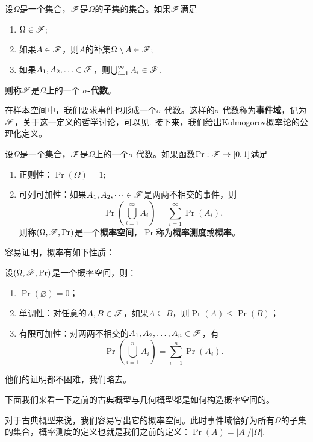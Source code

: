 \begin{definition}[$\sigma$-代数]
设$\Omega$是一个集合，$\mathscr{F}$是$\Omega$的子集的集合。如果$\mathscr{F}$满足
\begin{enumerate}
    \item $\Omega\in\mathscr{F}$;
    \item 如果$A\in\mathscr{F}$，则$A$的补集$\Omega\setminus A\in\mathscr{F}$;
    \item 如果$A_1,A_2,\ldots\in\mathscr{F}$，则$\bigcup_{i=1}^\infty A_i\in\mathscr{F}$.
\end{enumerate}
则称$\mathscr{F}$是$\Omega$上的一个 \textbf{$\sigma$-代数}。
\end{definition}

在样本空间中，我们要求事件也形成一个$\sigma$-代数。这样的$\sigma$-代数称为\textbf{事件域}，记为$\mathscr{F}$，关于这一定义的哲学讨论，可以见. 接下来，我们给出Kolmogorov概率论的公理化定义。

\begin{definition}
设$\Omega$是一个集合，$\mathscr{F}$是$\Omega$上的一个$\sigma$-代数。如果函数$\Pr:\mathscr{F}\to[0,1]$满足
\begin{enumerate}
    \item 正则性：$\Pr(\Omega)=1$;
    \item 可列可加性：如果$A_1,A_2,\dots\in\mathscr{F}$是两两不相交的事件，则
    \[
        \Pr\left(\bigcup_{i=1}^\infty A_i\right) = \sum_{i=1}^\infty \Pr(A_i),
    \]
    则称$(\Omega,\mathscr{F},\Pr)$是一个\textbf{概率空间}，$\Pr$称为\textbf{概率测度}或\textbf{概率}。
\end{enumerate}
\end{definition}
容易证明，概率有如下性质：
\begin{proposition}
设$(\Omega,\mathscr{F},\Pr)$是一个概率空间，则：
\begin{enumerate}
    \item $\Pr(\varnothing)=0$；
    \item 单调性：对任意的$A,B\in\mathscr{F}$，如果$A\subseteq B$，则$\Pr(A)\leq\Pr(B)$；
    \item 有限可加性：对两两不相交的$A_1,A_2,\dots,A_n\in\mathscr{F}$，有
    \[
        \Pr\left(\bigcup_{i=1}^n A_i\right) = \sum_{i=1}^n \Pr(A_i).
    \]
\end{enumerate}
\end{proposition}
他们的证明都不困难，我们略去。

下面我们来看一下之前的古典概型与几何概型都是如何构造概率空间的。

对于古典概型来说，我们容易写出它的概率空间。此时事件域恰好为所有$\Omega$的子集的集合，概率测度的定义也就是我们之前的定义：$\Pr(A)=|A|/|\Omega|$. 

